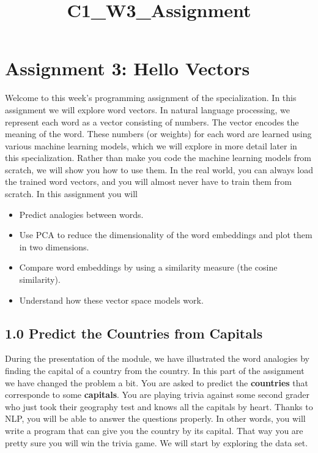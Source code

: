 \documentclass[11pt]{article}
\title{C1\_W3\_Assignment}
\providecommand{\tightlist}{%
      \setlength{\itemsep}{0pt}\setlength{\parskip}{0pt}}
\begin{document}
    
    \maketitle
    
    

    
    \hypertarget{assignment-3-hello-vectors}{%
\section{Assignment 3: Hello Vectors}\label{assignment-3-hello-vectors}}

Welcome to this week's programming assignment of the specialization. In
this assignment we will explore word vectors. In natural language
processing, we represent each word as a vector consisting of numbers.
The vector encodes the meaning of the word. These numbers (or weights)
for each word are learned using various machine learning models, which
we will explore in more detail later in this specialization. Rather than
make you code the machine learning models from scratch, we will show you
how to use them. In the real world, you can always load the trained word
vectors, and you will almost never have to train them from scratch. In
this assignment you will

\begin{itemize}
\tightlist
\item
  Predict analogies between words.
\item
  Use PCA to reduce the dimensionality of the word embeddings and plot
  them in two dimensions.
\item
  Compare word embeddings by using a similarity measure (the cosine
  similarity).
\item
  Understand how these vector space models work.
\end{itemize}

\hypertarget{predict-the-countries-from-capitals}{%
\subsection{1.0 Predict the Countries from
Capitals}\label{predict-the-countries-from-capitals}}

During the presentation of the module, we have illustrated the word
analogies by finding the capital of a country from the country. In this
part of the assignment we have changed the problem a bit. You are asked
to predict the \textbf{countries} that corresponde to some
\textbf{capitals}. You are playing trivia against some second grader who
just took their geography test and knows all the capitals by heart.
Thanks to NLP, you will be able to answer the questions properly. In
other words, you will write a program that can give you the country by
its capital. That way you are pretty sure you will win the trivia game.
We will start by exploring the data set.
\end{document}
